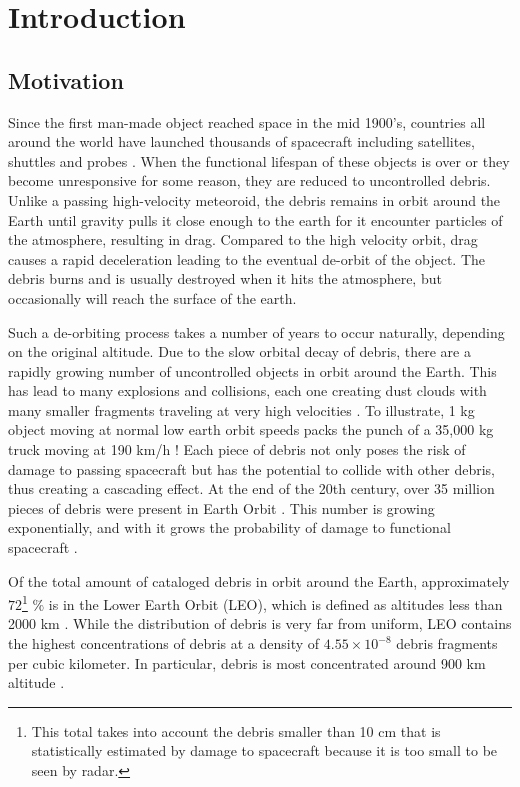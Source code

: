 \documentclass[12pt]{scrartcl}
\begin{document}
\section{Introduction} \label{sec:introduction}
\subsection{Motivation}
Since the first man-made object reached space in the mid 1900's, countries all around the world have launched thousands of spacecraft including satellites, shuttles and probes \cite{ODPO}. When the functional lifespan of these objects is over or they become unresponsive for some reason, they are reduced to uncontrolled debris. Unlike a passing high-velocity meteoroid, the debris remains in orbit around the Earth until gravity pulls it close enough to the earth for it encounter particles of the atmosphere, resulting in drag. Compared to the high velocity orbit, drag causes a rapid deceleration leading to the eventual de-orbit of the object. The debris burns and is usually destroyed when it hits the atmosphere, but occasionally will reach the surface of the earth.

Such a de-orbiting process takes a number of years to occur naturally, depending on the original altitude. Due to the slow orbital decay of debris, there are a rapidly growing number of uncontrolled objects in orbit around the Earth. This has lead to many explosions and collisions, each one creating dust clouds with many smaller fragments traveling at very high velocities \cite{UN}. To illustrate, 1 kg object moving at normal low earth orbit speeds packs the punch of a 35,000 kg truck moving at 190 km/h \cite{punch}! Each piece of debris not only poses the risk of damage to passing spacecraft but has the potential to collide with other debris, thus creating a cascading effect. At the end of the 20th century, over 35 million pieces of debris were present in Earth Orbit \cite{1995 IA}. This number is growing exponentially, and with it grows the probability of damage to functional spacecraft \cite{UN}.

Of the total amount of cataloged debris in orbit around the Earth, approximately \(72\)\footnote{This total takes into account the debris smaller than 10 cm that is statistically estimated by damage to spacecraft because it is too small to be seen by radar.} \(\% \) is in the Lower Earth Orbit (LEO), which is defined as altitudes less than 2000 km \cite{1995 IA}. While the distribution of debris is very far from uniform, LEO contains the highest concentrations of debris at a density of \(4.55 \times 10^{-8}\) debris fragments per cubic kilometer. In particular, debris is most concentrated around 900 km altitude \cite{fragments}. 
\end{document}
